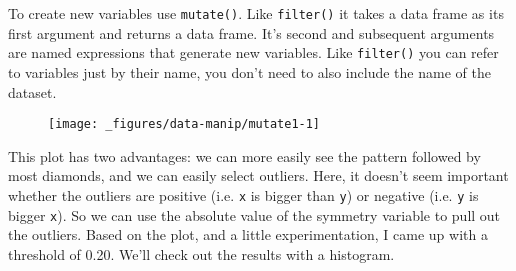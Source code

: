 To create new variables use \texttt{mutate()}. Like \texttt{filter()} it
takes a data frame as its first argument and returns a data frame. It's
second and subsequent arguments are named expressions that generate new
variables. Like \texttt{filter()} you can refer to variables just by
their name, you don't need to also include the name of the dataset.

\begin{Shaded}
\begin{Highlighting}[]
\StringTok{ }
   \StringTok{ }
   \StringTok{ } \NormalTok{+}\StringTok{ }\StringTok{ }\NormalTok{)}
\NormalTok{)}
\CommentTok{#> }

\StringTok{ }
\StringTok{  }\NormalTok{()}
\end{Highlighting}
\end{Shaded}

\begin{figure}[H]
  \centering
  \texttt{[image: \_figures/data-manip/mutate1-1]}
\end{figure}

This plot has two advantages: we can more easily see the pattern
followed by most diamonds, and we can easily select outliers. Here, it
doesn't seem important whether the outliers are positive (i.e.
\texttt{x} is bigger than \texttt{y}) or negative (i.e. \texttt{y} is
bigger \texttt{x}). So we can use the absolute value of the symmetry
variable to pull out the outliers. Based on the plot, and a little
experimentation, I came up with a threshold of 0.20. We'll check out the
results with a histogram.

